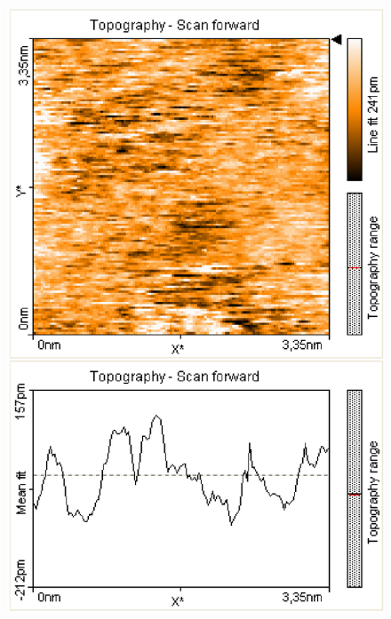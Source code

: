 \documentclass[12pt]{article}
\begin{document}
\begin{figure}[H]  
\begin{minipage}{0.4\linewidth}
\centering
\includegraphics[width=0.9\linewidth]{../plot/data/mos2/mos26.eps}
\end{minipage}
\begin{minipage}{0.2\linewidth}
\centering
\end{minipage}
\begin{minipage}{0.4\linewidth}
\centering

\end{minipage}
\end{figure}
\end{document}
